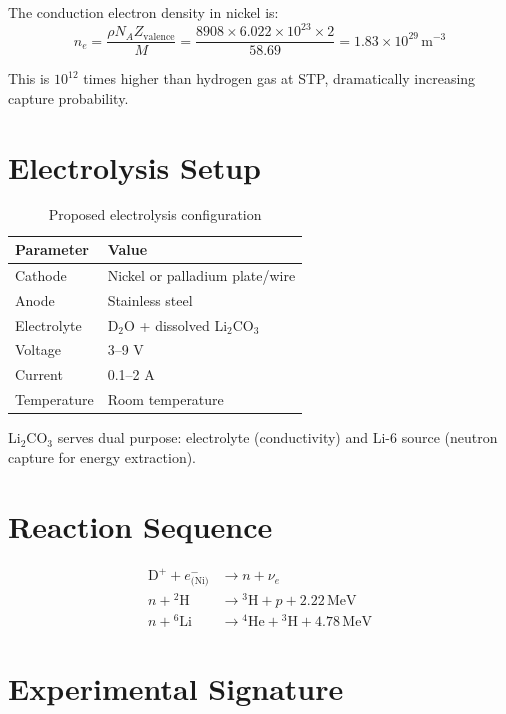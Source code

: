 \documentclass[12pt,a4paper]{article}
\begin{document}
The conduction electron density in nickel is:
\begin{equation}
n_e = \frac{\rho N_A Z_\text{valence}}{M}
= \frac{8908 \times 6.022\times10^{23} \times 2}{58.69}
= 1.83 \times 10^{29}\,\text{m}^{-3}
\end{equation}

This is $10^{12}$ times higher than hydrogen gas at STP,
dramatically increasing capture probability.

\section{Electrolysis Setup}

\begin{table}[h!]
\centering
\caption{Proposed electrolysis configuration}
\vspace{0.5em}
\begin{tabular}{ll}
\toprule
\textbf{Parameter} & \textbf{Value} \\
\midrule
Cathode & Nickel or palladium plate/wire \\
Anode & Stainless steel \\
Electrolyte & D$_2$O + dissolved Li$_2$CO$_3$ \\
Voltage & 3--9 V \\
Current & 0.1--2 A \\
Temperature & Room temperature \\
\bottomrule
\end{tabular}
\end{table}

Li$_2$CO$_3$ serves dual purpose: electrolyte (conductivity)
and Li-6 source (neutron capture for energy extraction).

\section{Reaction Sequence}

\begin{align}
\text{D}^+ + e^-_\text{(Ni)} &\rightarrow n + \nu_e \tag{E1}\\
n + {}^2\text{H} &\rightarrow {}^3\text{H} + p + 2.22\,\text{MeV} \tag{E2}\\
n + {}^6\text{Li} &\rightarrow {}^4\text{He} + {}^3\text{H} + 4.78\,\text{MeV} \tag{E3}
\end{align}

\section{Experimental Signature}
\end{document}
